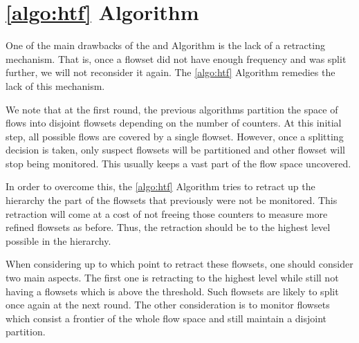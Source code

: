 \section{\ref{algo:htf} Algorithm}

One of the main drawbacks of the \simpleAlgo and \multipleAlgo Algorithm is the lack of a retracting mechanism. That is, once a flowset did not have enough frequency and was split further, we will not reconsider it again. The \ref{algo:htf} Algorithm remedies the lack of this mechanism.

We note that at the first round, the previous algorithms partition the space of flows into disjoint flowsets depending on the number of counters. At this initial step, all possible flows are covered by a single flowset. However, once a splitting decision is taken, only suspect flowsets will be partitioned and other flowset will stop being monitored. This  usually keeps a vast part of the flow space uncovered.

In order to overcome this, the \ref{algo:htf} Algorithm tries to retract up the hierarchy the part of the flowsets that previously were not be monitored. This retraction will come at a cost of not freeing those counters to measure more refined flowsets as before. Thus, the retraction should be to the highest level possible in the hierarchy.

When considering up to which point to retract these flowsets, one should consider two main aspects. The first one is retracting to the highest level while still not having a flowsets which is above the threshold.  Such flowsets are likely to split once again at the next round. The other consideration is to monitor flowsets which consist a frontier of the whole flow space and still maintain a disjoint partition.

